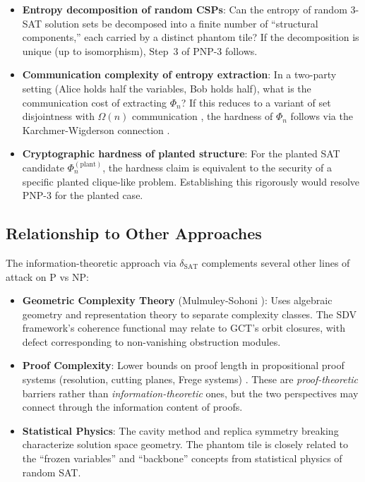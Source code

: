 \documentclass[11pt]{article}
\theoremstyle{definition}
\theoremstyle{remark}
\newcommand{\dSAT}{\delta_{\mathrm{SAT}}}
\begin{document}
\begin{itemize}
  \item \textbf{Entropy decomposition of random CSPs}: Can the entropy of
    random 3-SAT solution sets be decomposed into a finite number of
    ``structural components,'' each carried by a distinct phantom tile?
    If the decomposition is unique (up to isomorphism), Step~3 of PNP-3
    follows.

  \item \textbf{Communication complexity of entropy extraction}: In a
    two-party setting (Alice holds half the variables, Bob holds half),
    what is the communication cost of extracting $\Phi_n$?  If this reduces
    to a variant of set disjointness with $\Omega(n)$ communication
    \cite{Raz2}, the hardness of $\Phi_n$ follows via the Karchmer-Wigderson
    connection \cite{KW}.

  \item \textbf{Cryptographic hardness of planted structure}: For the planted
    SAT candidate $\Phi_n^{(\mathrm{plant})}$, the hardness claim is
    equivalent to the security of a specific planted clique-like problem.
    Establishing this rigorously would resolve PNP-3 for the planted case.
\end{itemize}

\subsection{Relationship to Other Approaches}

The information-theoretic approach via $\dSAT$ complements several other
lines of attack on P vs NP:

\begin{itemize}
  \item \textbf{Geometric Complexity Theory} (Mulmuley-Sohoni \cite{GCT}):
    Uses algebraic geometry and representation theory to separate complexity
    classes.  The SDV framework's coherence functional may relate to
    GCT's orbit closures, with defect corresponding to non-vanishing
    obstruction modules.

  \item \textbf{Proof Complexity}: Lower bounds on proof length in
    propositional proof systems (resolution, cutting planes, Frege systems)
    \cite{BPR97}.  These are \emph{proof-theoretic} barriers rather than
    \emph{information-theoretic} ones, but the two perspectives may connect
    through the information content of proofs.

  \item \textbf{Statistical Physics}: The cavity method and replica symmetry
    breaking \cite{MPZ} characterize solution space geometry.  The phantom
    tile is closely related to the ``frozen variables'' and ``backbone''
    concepts from statistical physics of random SAT.
\end{itemize}
\end{document}
